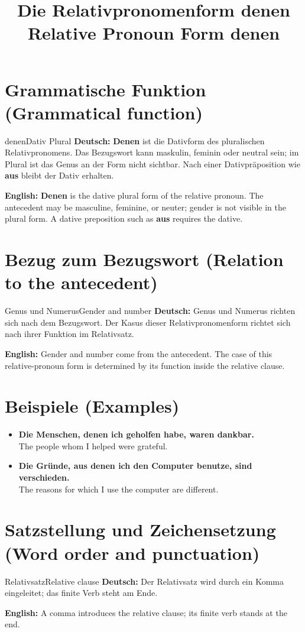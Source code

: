 \documentclass[a4paper,11pt]{article}
\title{Die Relativpronomenform \glqq denen\grqq{}\\\large Relative Pronoun Form \glqq denen\grqq{}}
\date{}
\newcommand{\GermanText}[1]{\textbf{Deutsch: }#1\par}
\newcommand{\EnglishText}[1]{{\small\color{SoftGray}\textbf{English: }#1\par}}
\newcommand{\ExampleItem}[2]{\item \textbf{#1}\\{\small\color{SoftGray}#2}}
\begin{document}
\maketitle
\tableofcontents
\newpage
\section{Grammatische Funktion (Grammatical function)}
\begin{grammarentry}{denen}{Dativ Plural}
\GermanText{\textbf{Denen} ist die Dativform des pluralischen Relativpronomens. Das Bezugswort kann maskulin, feminin oder neutral sein; im Plural ist das Genus an der Form nicht sichtbar. Nach einer Dativpräposition wie \textbf{aus} bleibt der Dativ erhalten.}
\EnglishText{\textbf{Denen} is the dative plural form of the relative pronoun. The antecedent may be masculine, feminine, or neuter; gender is not visible in the plural form. A dative preposition such as \textbf{aus} requires the dative.}
\end{grammarentry}
\section{Bezug zum Bezugswort (Relation to the antecedent)}
\begin{grammarentry}{Genus und Numerus}{Gender and number}
\GermanText{Genus und Numerus richten sich nach dem Bezugswort. Der Kasus dieser Relativpronomenform richtet sich nach ihrer Funktion im Relativsatz.}
\EnglishText{Gender and number come from the antecedent. The case of this relative-pronoun form is determined by its function inside the relative clause.}
\end{grammarentry}
\section{Beispiele (Examples)}
\begin{exbox}\begin{itemize}
\ExampleItem{Die Menschen, denen ich geholfen habe, waren dankbar.}{The people whom I helped were grateful.}
\ExampleItem{Die Gründe, aus denen ich den Computer benutze, sind verschieden.}{The reasons for which I use the computer are different.}
\end{itemize}\end{exbox}
\section{Satzstellung und Zeichensetzung (Word order and punctuation)}
\begin{grammarentry}{Relativsatz}{Relative clause}
\GermanText{Der Relativsatz wird durch ein Komma eingeleitet; das finite Verb steht am Ende.}
\EnglishText{A comma introduces the relative clause; its finite verb stands at the end.}
\end{grammarentry}
\end{document}
